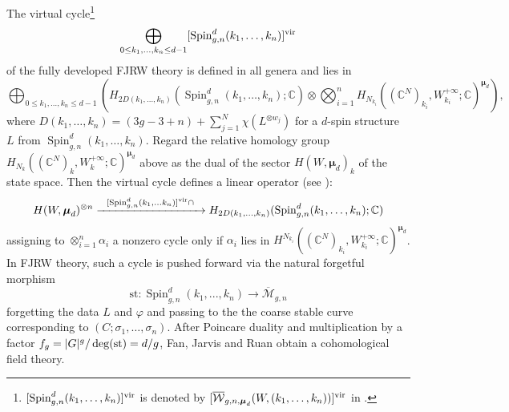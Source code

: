 \documentclass[11pt]{amsart}
\theoremstyle{definition} %
\theoremstyle{remark} %
\newcommand{\CC}{\mathbb C}
\newcommand{\al}{\alpha}
\newcommand{\fie}{\varphi}
\def\vir{{\rm vir}}
\def\ol{\overline}
\newcommand{\bmu}{\boldsymbol{\mu}}
\newcommand{\Spin}{\operatorname{Spin}}
\newcommand{\ov}{\overline}
\begin{document}
The virtual cycle\footnote{
$[\Spin_{g,n}^d(k_1,\dots,k_n)]^{\rm vir}$ is denoted by  
$[\ol{\mathcal{W}}_{g,n,\bmu_d}(W,(k_1,\dots,k_n))]^{\rm vir}$ 
in \cite{FJR1}.} 
\[
\bigoplus_{0\le k_1,\dots,k_n \le d-1} 
[\Spin_{g,n}^d(k_1,\dots,k_n)]^{\rm vir}
\] 
of the fully developed FJRW theory is defined in all genera and lies in
\[
\bigoplus_{0\le k_1,\dots, k_n\le d-1} \left(  
H_{2D(k_1,\dots,k_n)}
(\Spin^d_{g,n}(k_1,\dots,k_n);\CC)\otimes \bigotimes_{i=1}^n
H_{N_{k_i}} 
\left((\CC^N)_{k_i}, W_{k_i}^{+\infty};\CC\right)^{\bmu_d}\right),
\]
where $D(k_1,\dots,k_n)=(3g-3+n)+\sum_{j=1}^N\chi(L^{\otimes w_j})$ 
for a $d$-spin structure $L$ from $\Spin^d_{g,n}(k_1,\dots,k_n)$. 
Regard the relative homology group 
$H_{N_{k}}((\CC^N)_k, W_k^{+\infty};\CC)^{\bmu_d}$ above 
as the dual of 
the sector $H(W,\bmu_d)_k$ of the state space. 
Then the  
virtual cycle defines a linear operator (see \cite[Eqn (63)]{FJR1}): 
\begin{align*}
H(W,\bmu_d)^{\otimes n}
\xrightarrow{\ \ [\Spin_{g,n}^d (k_1,\dots k_n)]^{\vir}\cap\ \ } 
H_{2D(k_1,\dots,k_n)}(\Spin^d_{g,n}(k_1,\dots,k_n);\CC)
\end{align*}
 assigning to $\otimes_{i=1}^n \alpha_i$ a nonzero cycle only if 
 $\alpha_i$ lies in   
$H^{N_{k_i}} 
((\CC^N)_{k_i}, W_{k_i}^{+\infty};\CC)^{\bmu_d}$. 
In FJRW theory, such a cycle is 
pushed forward via the natural forgetful morphism 
\[
\mathrm{st} \colon \Spin^d_{g,n}(k_1,...,k_n) \to 
\ov{\mathcal M}_{g,n}
\] 
forgetting the data $L$ and $\varphi$ and 
passing to the the coarse stable curve corresponding to 
$(C; \sigma_1,\dots,\sigma_n)$. 
After Poincare duality and multiplication by a factor 
$f_g = |G|^g/\deg({\rm st}) = d/g$, 
Fan, Jarvis and Ruan obtain a cohomological field theory. 
\end{document}
